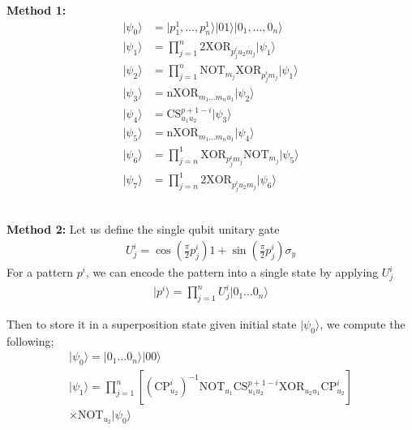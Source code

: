 \begin{minipage}[b]{0.45\textwidth}
\textbf{Method 1:}
\begin{align*}{}
\vert \psi_0 \rangle & =  \vert p_1^1,\dots,p_n^1\rangle\vert 01\rangle\vert0_1,\dots,0_n \rangle\\
\vert \psi_1 \rangle & =  \prod\limits_{j=1}^{n} \textrm{2XOR}_{p_j^i u_2 m_j} \vert \psi_1 \rangle\\
\vert \psi_2 \rangle & =  \prod\limits_{j=1}^{n} \textrm{NOT}_{m_j} \textrm{XOR}_{p_j^i m_j}  \vert \psi_1 \rangle\\
\vert \psi_3 \rangle & =  \textrm{nXOR}_{m_1\dots m_n u_1}  \vert \psi_2 \rangle\\
\vert \psi_4 \rangle & =  \textrm{CS}_{u_1 u_2}^{p+1-i}  \vert \psi_3 \rangle\\
\vert \psi_5 \rangle & =  \textrm{nXOR}_{m_1\dots m_n u_1}  \vert \psi_4 \rangle\\
\vert \psi_6 \rangle & =  \prod\limits_{j=n}^{1} \textrm{XOR}_{p_j^i m_j} \textrm{NOT}_{m_j}  \vert \psi_5 \rangle\\
\vert \psi_7 \rangle & =  \prod\limits_{j=n}^{1} 2\textrm{XOR}_{p_j^i u_2 m_j} \vert \psi_6 \rangle
\end{align*}
\hspace{10pt}\\
\hspace{10pt}
\end{minipage}
\begin{minipage}[b]{0.45\textwidth}
\textbf{Method 2:}
Let us define the single qubit unitary gate
\begin{align*}{}
U_j^i = \cos\left(\frac{\pi}{2} p_j^i\right)1 + \sin \left(\frac{\pi}{2} p_j^i\right)\sigma_y
\end{align*}
For a pattern $p^i$, we can encode the pattern into a single state by applying $U_j^i$
\begin{align*}
    \vert p^i \rangle = \prod\limits_{j=1}^n U_j^i \vert 0_1\dots 0_n\rangle
\end{align*}

Then to store it in a superposition state given initial state $\vert\psi_0\rangle$, we compute the following;
\begin{multline*}
    \vert\psi_0 \rangle = \vert 0_1\dots0_n\rangle\vert00\rangle\\
    \vert\psi_1 \rangle = \prod\limits_{j=1}^{n} \left[\left( \textrm{CP}_{u_2}^{i}\right)^{-1} \textrm{NOT}_{u_1} \textrm{CS}_{u_1u_2}^{p+1-i} \textrm{XOR}_{u_{2}u_{1}} \textrm{CP}_{u_{2}}^{i}\right] \\ \times \textrm{NOT}_{u_2} \vert\psi_0\rangle    
\end{multline*}
\end{minipage}

